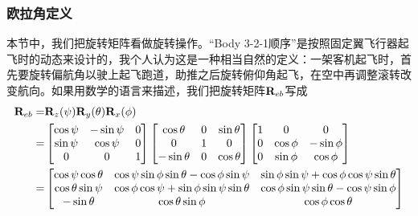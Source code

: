 \documentclass[11pt]{article}
\begin{document}
\subsubsection{欧拉角定义}
本节中，我们把旋转矩阵看做旋转操作。“Body 3-2-1顺序”是按照固定翼飞行器起飞时的动态来设计的，我个人认为这是一种相当自然的定义：一架客机起飞时，首先要旋转偏航角以驶上起飞跑道，助推之后旋转俯仰角起飞，在空中再调整滚转改变航向。如果用数学的语言来描述，我们把旋转矩阵${\bf R}_{eb}$写成
\begin{align}
{\bf R}_{eb} = &  {\bf R}_z(\psi){\bf R}_y(\theta){\bf R}_x(\phi) \\
\label{eqn:eulerparts}	= & 
\begin{bmatrix}
\cos\psi & - \sin\psi & 0\\
\sin\psi & \cos\psi & 0\\
0 & 0 & 1
\end{bmatrix}
\begin{bmatrix}
\cos\theta & 0 & \sin\theta\\
0 & 1 & 0\\
-\sin\theta & 0 & \cos\theta \\
\end{bmatrix}
\begin{bmatrix}
1 & 0 & 0 \\
0 & \cos\phi & -\sin\phi \\
0 & \sin\phi & \cos\phi 
\end{bmatrix}\\
\label{eqn:euler}= &
\begin{bmatrix}
  \cos\psi\cos\theta& \cos\psi\sin\phi\sin\theta - \cos\phi\sin\psi& \sin\phi\sin\psi + \cos\phi\cos\psi\sin\theta \\
  \cos\theta\sin\psi& \cos\phi\cos\psi + \sin\phi\sin\psi\sin\theta& \cos\phi\sin\psi\sin\theta - \cos\psi\sin\phi  \\
          -\sin\theta&                              \cos\theta\sin\phi&                              \cos\phi\cos\theta
\end{bmatrix} 
\end{align}
\end{document}
